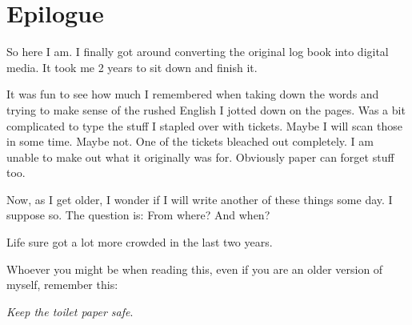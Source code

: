 \chapter{Epilogue}

So here I am.
I finally got around converting the original log book into digital media.
It took me 2 years to sit down and finish it.

It was fun to see how much I remembered when taking down the words and trying to make sense of the rushed English I jotted down on the pages.
Was a bit complicated to type the stuff I stapled over with tickets.
Maybe I will scan those in some time.
Maybe not.
One of the tickets bleached out completely.
I am unable to make out what it originally was for.
Obviously paper can forget stuff too.

Now, as I get older, I wonder if I will write another of these things some day.
I suppose so.
The question is: From where?
And when?

Life sure got a lot more crowded in the last two years.

Whoever you might be when reading this, even if you are an older version of myself, remember this:

\emph{Keep the toilet paper safe}.




